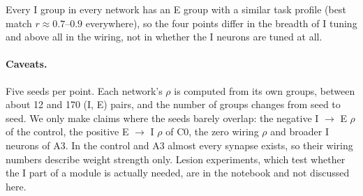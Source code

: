 \documentclass[11pt,a4paper]{article}
\begin{document}
Every I group in every network has an E group with a similar task profile (best match $r \approx 0.7$--$0.9$
everywhere), so the four points differ in the breadth of I tuning and above all in the wiring, not in whether
the I neurons are tuned at all.

\paragraph{Caveats.}
Five seeds per point. Each network's $\rho$ is computed from its own groups, between about 12 and 170 (I, E)
pairs, and the number of groups changes from seed to seed. We only make claims where the seeds barely overlap:
the negative I $\to$ E $\rho$ of the control, the positive E $\to$ I $\rho$ of C0, the zero wiring $\rho$ and
broader I neurons of A3. In the control and A3 almost every synapse exists, so their wiring numbers describe
weight strength only. Lesion experiments, which test whether the I part of a module is actually needed, are
in the notebook and not discussed here.
\end{document}
